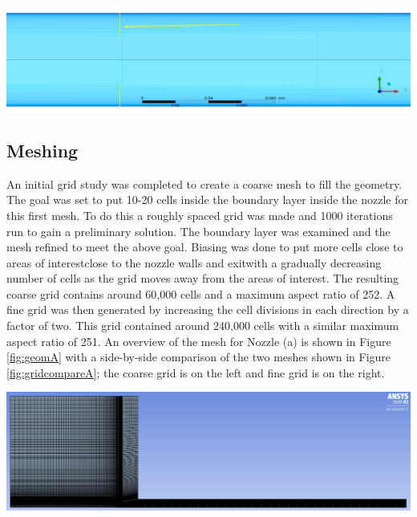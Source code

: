 \documentclass[12pt]{article} %
\begin{document}
\begin{center}
    \includegraphics[width = \linewidth]{BoundaryLength.PNG}
    \label{fig:boundarylength}
\end{center}

\subsection{Meshing}\label{section:mesh}
An initial grid study was completed to create a coarse mesh to fill the geometry. The goal was set to put 10-20 cells inside the boundary layer inside the nozzle for this first mesh. To do this a roughly spaced grid was made and 1000 iterations run to gain a preliminary solution. The boundary layer was examined and the mesh refined to meet the above goal. Biasing was done to put more cells close to areas of interest\textemdash close to the nozzle walls and exit\textemdash with a gradually decreasing number of cells as the grid moves away from the areas of interest. The resulting coarse grid contains around 60,000 cells and a maximum aspect ratio of 252. A fine grid was then generated by increasing the cell divisions in each direction by a factor of two. This grid contained around 240,000 cells with a similar maximum aspect ratio of 251. An overview of the mesh for Nozzle (a) is shown in Figure \ref{fig:geomA} with a side-by-side comparison of the two meshes shown in Figure \ref{fig:gridcompareA}; the coarse grid is on the left and fine grid is on the right.

\begin{center}
    \includegraphics[width = \linewidth]{NozzleA_Mesh.PNG}
    \label{fig:geomA}
\end{center}
\end{document}
